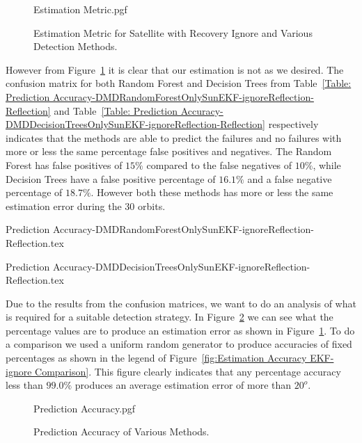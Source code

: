 \documentclass[letterpaper, 10 pt, conference]{ieeeconf}  %
\begin{document}
\begin{figure}[!htb]
	\begin{center}
		{Estimation Metric.pgf}
	\end{center}
	\caption[Estimation Metric for Satellite with Recovery Ignore and Various detection Methods]{Estimation Metric for Satellite with Recovery Ignore and Various Detection Methods.}
	\label{fig:Estimation Accuracy EKF-ignore summary}
\end{figure}

However from Figure~\ref{fig:Estimation Accuracy EKF-ignore summary} it is clear that our estimation is not as we desired. The confusion matrix for both Random Forest and Decision Trees from Table~\ref{Table: Prediction Accuracy-DMDRandomForestOnlySunEKF-ignoreReflection-Reflection} and Table~\ref{Table: Prediction Accuracy-DMDDecisionTreesOnlySunEKF-ignoreReflection-Reflection} respectively indicates that the methods are able to predict the failures and no failures with more or less the same percentage false positives and negatives. The Random Forest has false positives of $15\%$ compared to the false negatives of $10\%$, while Decision Trees have a false positive percentage of $16.1\%$ and a false negative percentage of $18.7\%$. However both these methods has more or less the same estimation error during the 30 orbits.

{Prediction Accuracy-DMDRandomForestOnlySunEKF-ignoreReflection-Reflection.tex}

{Prediction Accuracy-DMDDecisionTreesOnlySunEKF-ignoreReflection-Reflection.tex}

Due to the results from the confusion matrices, we want to do an analysis of what is required for a suitable detection strategy. In Figure~\ref{fig:Prediction Accuracy EKF-ignore summary} we can see what the percentage values are to produce an estimation error as shown in Figure~\ref{fig:Estimation Accuracy EKF-ignore summary}. To do a comparison we used a uniform random generator to produce accuracies of fixed percentages as shown in the legend of Figure~\ref{fig:Estimation Accuracy EKF-ignore Comparison}. This figure clearly indicates that any percentage accuracy less than $99.0\%$ produces an average estimation error of more than $20^o$. 

\begin{figure}[!htb]
	\begin{center}
		{Prediction Accuracy.pgf}
	\end{center}
	\caption[Prediction Accuracy of Various Methods]{Prediction Accuracy of Various Methods.}
	\label{fig:Prediction Accuracy EKF-ignore summary}
\end{figure}
\end{document}
